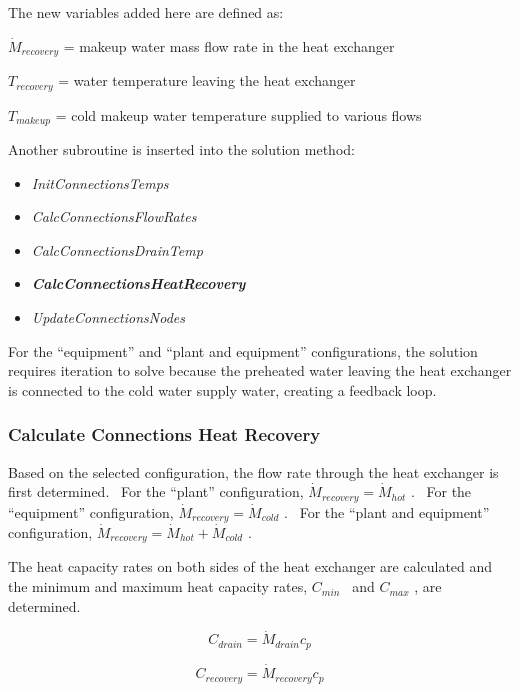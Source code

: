 The new variables added here are defined as:

\({\dot M_{recovery}}\) = makeup water mass flow rate in the heat exchanger

\({T_{recovery}}\) = water temperature leaving the heat exchanger

\({T_{makeup}}\) = cold makeup water temperature supplied to various flows

Another subroutine is inserted into the solution method:

\begin{itemize}
\item
  \emph{InitConnectionsTemps}
\item
  \emph{CalcConnectionsFlowRates}
\item
  \emph{CalcConnectionsDrainTemp}
\item
  \textbf{\emph{CalcConnectionsHeatRecovery}}
\item
  \emph{UpdateConnectionsNodes}
\end{itemize}

For the ``equipment'' and ``plant and equipment'' configurations, the solution requires iteration to solve because the preheated water leaving the heat exchanger is connected to the cold water supply water, creating a feedback loop.

\subsubsection{Calculate Connections Heat Recovery}\label{calculate-connections-heat-recovery}

Based on the selected configuration, the flow rate through the heat exchanger is first determined.~ For the ``plant'' configuration, \({\dot M_{recovery}} = {\dot M_{hot}}\) .~ For the ``equipment'' configuration, \({\dot M_{recovery}} = {\dot M_{cold}}\) .~ For the ``plant and equipment'' configuration, \({\dot M_{recovery}} = {\dot M_{hot}} + {\dot M_{cold}}\) .

The heat capacity rates on both sides of the heat exchanger are calculated and the minimum and maximum heat capacity rates, \({C_{min}}\) ~and \({C_{max}}\) , are determined.

\begin{equation}
{C_{drain}} = {\dot M_{drain}}{c_p}
\end{equation}

\begin{equation}
{C_{recovery}} = {\dot M_{recovery}}{c_p}
\end{equation}

